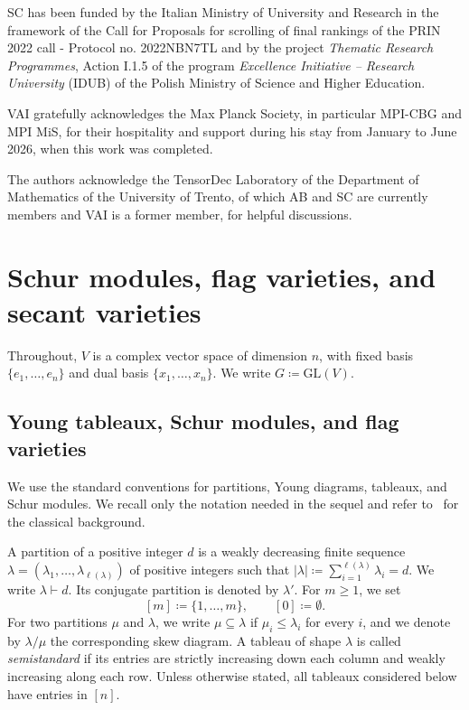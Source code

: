 \documentclass[a4paper,reqno]{amsart}
\theoremstyle{plainnopunct}
\theoremstyle{definitionnopunct}
\newcommand{\GL}{\mathrm{GL}}
\begin{document}
SC has been funded by the Italian Ministry of University and Research in the framework of the Call for Proposals for scrolling of final rankings of the PRIN 2022 call - Protocol no. 2022NBN7TL and by the project \textit{Thematic Research Programmes}, Action I.1.5 of the program \textit{Excellence Initiative -- Research University} (IDUB) of the Polish Ministry of Science and Higher Education.

VAI gratefully acknowledges the Max Planck Society, in particular MPI-CBG and MPI MiS, for their hospitality and support during his stay from January to June 2026, when this work was completed.

The authors acknowledge the TensorDec Laboratory of the Department of Mathematics of the University of Trento, of which AB and SC are currently members and VAI is a former member, for helpful discussions.


\section{Schur modules, flag varieties, and secant varieties}
\label{sect: preliminary}

\noindent Throughout, $V$ is a complex vector space of dimension $n$, with fixed basis $\{e_1,\dots,e_n\}$ and dual basis $\{x_1,\dots,x_n\}$. We write $G\coloneqq\GL(V)$. 

\subsection{Young tableaux, Schur modules, and flag varieties}
\label{subsect: tableaux}

We use the standard conventions for partitions, Young diagrams, tableaux, and Schur modules. We recall only the notation needed in the sequel and refer to~\cite{Fulton1997,FultonHarris1991} for the classical background.

A partition of a positive integer $d$ is a weakly decreasing finite sequence $\lambda=(\lambda_1,\ldots,\lambda_{\ell(\lambda)})$
of positive integers such that $|\lambda|
\coloneq
\sum_{i=1}^{\ell(\lambda)}\lambda_i
=
d$.
We write $\lambda\vdash d$. Its conjugate partition is denoted by $\lambda'$. For $m\geq1$, we set
\[
[m]\coloneq\{1,\ldots,m\},
\qquad
[0]\coloneq\emptyset.
\]
For two partitions $\mu$ and $\lambda$, we write $\mu\subseteq\lambda$ if $\mu_i\leq\lambda_i$ for every $i$, and we denote by $\lambda/\mu$ the corresponding skew diagram. A tableau of shape $\lambda$ is called \emph{semistandard} if its entries are strictly increasing down each column and weakly increasing along each row. Unless otherwise stated, all tableaux considered below have entries in $[n]$.
\end{document}

